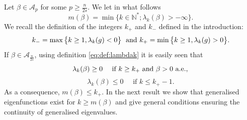 \documentclass[10pt]{amsart}
\numberwithin{equation}{section}
\newcommand{\N}{\mathbb{N}}
\def\la{{\lambda}}
\theoremstyle{plain}
\theoremstyle{remark}
\begin{document}
\medskip

Let $\beta \in \mathcal{A}_p$ for some $ p \ge \frac{n}{2s}$. We let in what follows 
\begin{equation} \label{def:mbeta}
m(\beta) = \min \Big \{ k \in \N^*; \lambda_k(\beta) > -\infty  \Big\}.
\end{equation}
We recall the definition of the integers $k_+$ and $k_-$ defined in the introduction: 
$$k_- = \max \big\{k \geq 1,  \la_k(g)<0 \big\} \; \hbox{ and } k_+= \min  \big \{k \geq 1, \la_k(g)>0 \big\}.$$
If $\beta \in \mathcal{A}_{\frac{n}{2s}}$, using definition \eqref{eq:def:lambdak} it is easily seen that 
\begin{equation} \label{eq:enplus:kplus}
\lambda_k(\beta)  \ge 0 \quad   \text{ if } k \ge k_+ \text{ and } \beta >0 \text{ a.e.},  \\
\end{equation}
\begin{equation} \label{eq:enplus:kmoins}
\lambda_k(\beta)  \le 0 \quad  \text{ if } k \le k_+-1. 
\end{equation}
As a consequence, $m(\beta) \le k_+$.  In the next result we show that generalised eigenfunctions exist for $k \ge m(\beta)$ and give general conditions ensuring the continuity of generalised eigenvalues. 
\end{document}
